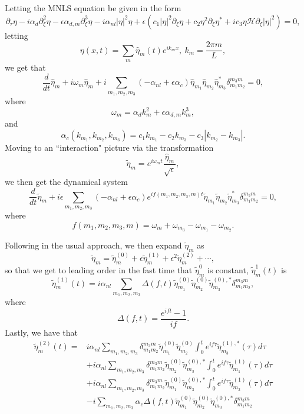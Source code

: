 \documentclass[a4paper,11pt]{article}
\newcommand{\pd}{\partial}
\begin{document}
Letting the MNLS equation be given in the form
\[
\pd_{\tau}\eta - i\alpha_{d}\pd^{2}_{\xi}\eta -\epsilon\alpha_{d,m}\pd_{\xi}^{3}\eta- i\alpha_{nl}\left|\eta\right|^{2}\eta + \epsilon\left(c_{1}\left|\eta \right|^{2}\pd_{\xi}\eta + c_{2}\eta^{2}\pd_{\xi}\eta^{\ast} + ic_{3}\eta\mathcal{H}\pd_{\xi}\left|\eta\right|^{2}\right) = 0,
\]
letting 
\[
\eta(x,t) = \sum_{m}\hat{\eta}_{m}(t) e^{ik_{m}x}, ~ k_{m} = \frac{2\pi m}{L},
\]
we get that
\[
\frac{d}{dt}\hat{\eta}_{m} + i\omega_{m}\hat{\eta}_{m} + i\sum_{m_{1},m_{2},m_{3}}\left(-\alpha_{nl} + \epsilon\alpha_{c} \right)\hat{\eta}_{m_{1}}\hat{\eta}_{m_{2}}\hat{\eta}^{\ast}_{m_{3}}\delta^{m_{3}m}_{m_{1}m_{2}} = 0,
\]
where
\[
\omega_{m} = \alpha_{d}k_{m}^{2} + \epsilon\alpha_{d,m}k_{m}^{3},
\]
and
\[
\alpha_{c}\left(k_{m_{1}},k_{m_{2}},k_{m_{3}}\right) = c_{1}k_{m_{1}} - c_{2}k_{m_{3}} - c_{3}\left|k_{m_{2}}-k_{m_{3}}\right|.
\]
Moving to an ``interaction" picture via the transformation
\[
\tilde{\eta}_{m} = e^{i\omega_{m}t} \frac{\hat{\eta}_{m}}{\sqrt{\epsilon}},
\]
we then get the dynamical system
\[
\frac{d}{dt}\tilde{\eta}_{m} + i\epsilon \sum_{m_{1},m_{2},m_{3}}\left(-\alpha_{nl} + \epsilon\alpha_{c} \right)e^{if(m_{1},m_{2},m_{3},m)t}\tilde{\eta}_{m_{1}}\tilde{\eta}_{m_{2}}\tilde{\eta}^{\ast}_{m_{3}}\delta^{m_{3}m}_{m_{1}m_{2}} = 0,
\]
where
\[
f(m_{1},m_{2},m_{3},m) = \omega_{m} + \omega_{m_{3}} - \omega_{m_{1}} - \omega_{m_{2}}.
\]

Following in the usual approach, we then expand $\tilde{\eta}_{m}$ as 
\[
\tilde{\eta}_{m} = \tilde{\eta}^{(0)}_{m} + \epsilon \tilde{\eta}^{(1)}_{m} + \epsilon^{2}\tilde{\eta}^{(2)}_{m} + \cdots,
\]
so that we get to leading order in the fast time that $\tilde{\eta}^{0}_{m}$ is constant, $\tilde{\eta}^{1}_{m}(t)$ is 
\[
\tilde{\eta}^{(1)}_{m}(t) = i\alpha_{nl}\sum_{m_{1},m_{2},m_{3}}\Delta(f,t)\tilde{\eta}^{(0)}_{m_{1}}\tilde{\eta}^{(0)}_{m_{2}}\tilde{\eta}^{(0),\ast}_{m_{3}}\delta^{m_{3}m}_{m_{1}m_{2}},
\]
where
\[
\Delta(f,t) = \frac{e^{ift}-1}{if}.
\]
Lastly, we have that 
\begin{align*}
\tilde{\eta}^{(2)}_{m}(t) = & i\alpha_{nl}\sum_{m_{1},m_{2},m_{3}}\delta^{m_{3}m}_{m_{1}m_{2}}\tilde{\eta}^{(0)}_{m_{1}}\tilde{\eta}^{(0)}_{m_{2}}\int_{0}^{t}e^{if\tau} \tilde{\eta}^{(1),\ast}_{m_{3}}(\tau)d\tau  \\
&+ i\alpha_{nl}\sum_{m_{1},m_{2},m_{3}}\delta^{m_{3}m}_{m_{1}m_{2}}\tilde{\eta}^{(0)}_{m_{2}}\tilde{\eta}^{(0),\ast}_{m_{3}}\int_{0}^{t}e^{if\tau} \tilde{\eta}^{(1)}_{m_{1}}(\tau)d\tau\\
&+i\alpha_{nl}\sum_{m_{1},m_{2},m_{3}}\delta^{m_{3}m}_{m_{1}m_{2}}\tilde{\eta}^{(0)}_{m_{1}}\tilde{\eta}^{(0),\ast}_{m_{3}}\int_{0}^{t}e^{if\tau} \tilde{\eta}^{(1)}_{m_{2}}(\tau)d\tau\\
&-i \sum_{m_{1},m_{2},m_{3}}\alpha_{c}\Delta(f,t)\tilde{\eta}^{(0)}_{m_{1}}\tilde{\eta}^{(0)}_{m_{2}}\tilde{\eta}^{(0),\ast}_{m_{3}}\delta^{m_{3}m}_{m_{1}m_{2}}
\end{align*}
\end{document}
